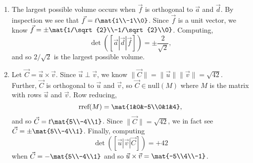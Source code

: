\begin{enumerate}
			\item The largest possible volume occurs when $\vec f$ is orthogonal to $\vec a$ and $\vec d$.
				By inspection we see that $\vec f=t\mat{1\\-1\\0}$. Since $\vec f$ is a unit vector, we know
				$\vec f=\pm\mat{1/\sqrt{2}\\-1/\sqrt{2}\\0}$. Computing,
				\[
					\det([\vec a|\vec d|\vec f]) = \pm \frac{2}{\sqrt{2}},
				\]
				and so $2/\sqrt{2}$ is the largest possible volume.
			\item Let $\vec C=\vec u\times \vec v$. Since $\vec u\perp \vec v$, we know $\|\vec C\|=\|\vec u\|\|\vec v\|=\sqrt{42}$.
				Further, $\vec C$ is orthogonal to $\vec u$ and $\vec v$, so $\vec C\in \text{null}(M)$ where $M$ is the matrix
				with rows $\vec u$ and $\vec v$. Row reducing,
				\[
					\text{rref}(M) = \mat{1&0&-5\\0&1&4},
				\]
				and so $\vec C=t\mat{5\\-4\\1}$. Since $\|\vec C\|=\sqrt{42}$, we in fact see $\vec C=\pm \mat{5\\-4\\1}$. Finally,
				computing
				\[
					\det([\vec u|\vec v|\vec C]) = +42
				\]
				when $\vec C=-\mat{5\\-4\\1}$ and so $\vec u\times \vec v = \mat{-5\\4\\-1}$.
		\end{enumerate}

